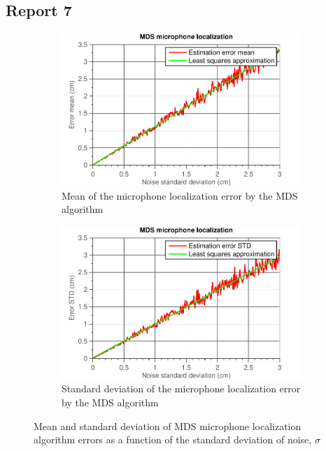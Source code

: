 \documentclass[11pt,titlepage]{report}
\begin{document}
\subsection{Report 7}
\begin{figure}[H]
	\begin{subfigure}{.49\textwidth}
		\includegraphics[width=\linewidth]{../../deliverable-7-resources/figures/ass-2/report-7-8/ass-2-report-7-mean.pdf}
		\caption{\centering Mean of the microphone localization error by the MDS algorithm}
	\end{subfigure}
	\begin{subfigure}{.49\textwidth}
		\includegraphics[width=\linewidth]{../../deliverable-7-resources/figures/ass-2/report-7-8/ass-2-report-7-std.pdf}
		\caption{\centering Standard deviation of the microphone localization error by the MDS algorithm}
	\end{subfigure}
	\caption{Mean and standard deviation of MDS microphone localization algorithm errors as a function of the standard deviation of noise, $\sigma$}
	\label{fig:ass-2-rep-7}
\end{figure}
\end{document}

